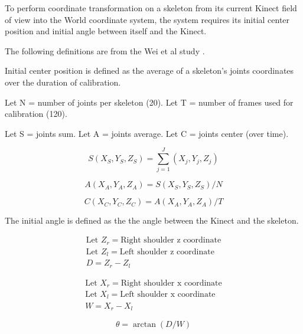 To perform coordinate transformation on a skeleton from its current Kinect field of view into the World coordinate system, the system requires its initial center position and initial angle between itself and the Kinect.  

The following definitions are from the Wei et al study \cite{wei_kinect_calibration}.

Initial center position is defined as the average of a skeleton's joints coordinates over the duration of calibration.

Let N = number of joints per skeleton (20). Let T = number of frames used for calibration (120).

Let S = joints sum. Let A = joints average. Let C = joints center (over time). 

\begin{equation}
\label{eq:joints_sum}
S(X_S, Y_S, Z_S) = \sum_{j=1}^J (X_j, Y_j, Z_j)
\end{equation}

\begin{equation}
\label{eq:joints_average}
A(X_A, Y_A, Z_A) = S(X_S, Y_S, Z_S) / N
\end{equation}

\begin{equation}
\label{eq:joints_center}
C(X_C, Y_C, Z_C) = A(X_A, Y_A, Z_A) / T
\end{equation}

The initial angle is defined as the the angle between the Kinect and the skeleton.

\begin{equation}
\label{eq:theta_d}
\begin{gathered}
\text{Let } Z_r = \text{Right shoulder z coordinate} \\
\text{Let } Z_l = \text{Left shoulder z coordinate} \\
D = Z_r - Z_l
\end{gathered}
\end{equation}

\begin{equation}
\label{eq:theta_w}
\begin{gathered}
\text{Let } X_r = \text{Right shoulder x coordinate} \\
\text{Let } X_l = \text{Left shoulder x coordinate} \\
W = X_r - X_l
\end{gathered}
\end{equation}

\begin{equation}
\label{eq:theta}
\theta = \arctan(D/W)
\end{equation}

